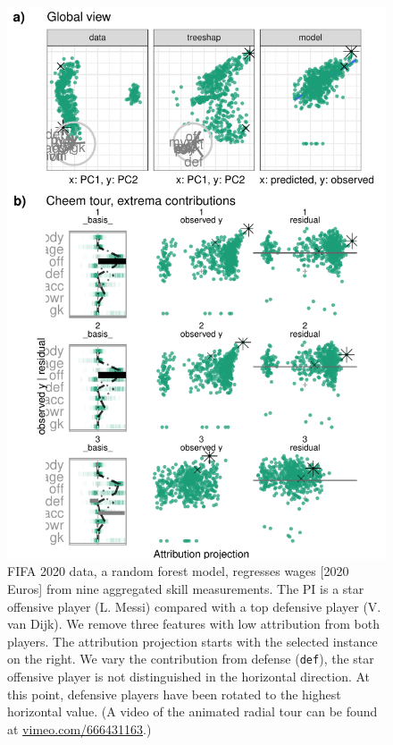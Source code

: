 \documentclass[
]{article}
\begin{document}
\begin{figure}

{\centering \includegraphics[width=1\linewidth]{./figures/case_fifa} 

}

\caption{FIFA 2020 data, a random forest model, regresses wages {[}2020 Euros{]} from nine aggregated skill measurements. The PI is a star offensive player (L. Messi) compared with a top defensive player (V. van Dijk). We remove three features with low attribution from both players. The attribution projection starts with the selected instance on the right. We vary the contribution from defense (\texttt{def}), the star offensive player is not distinguished in the horizontal direction. At this point, defensive players have been rotated to the highest horizontal value. (A video of the animated radial tour can be found at \href{https://vimeo.com/666431163}{vimeo.com/666431163}.)}\label{fig:casefifa}
\end{figure}
\end{document}
